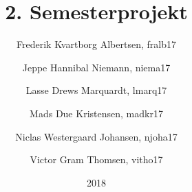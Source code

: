 \documentclass[../main.tex]{subfiles}
\title{2. Semesterprojekt}
\author{
    Frederik Kvartborg Albertsen, fralb17
  \and
    Jeppe Hannibal Niemann, niema17
  \and
    Lasse Drews Marquardt, lmarq17
  \and
    Mads Due Kristensen, madkr17
  \and
    Niclas Westergaard Johansen, njoha17
  \and
    Victor Gram Thomsen, vitho17
}
\date{2018}
\begin{document}
  \maketitle
  \begin{abstract}
  \end{abstract}
  \newpage
\end{document}
